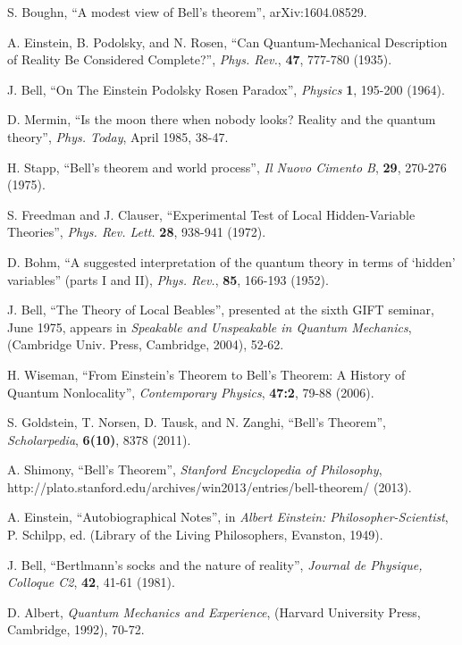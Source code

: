 \documentclass[12pt]{article}
\begin{document}
\begin{thebibliography}{99}

 S. Boughn, ``A modest view of Bell's theorem'', arXiv:1604.08529.

 A. Einstein, B. Podolsky, and N. Rosen, ``Can Quantum-Mechanical Description of Reality Be Considered Complete?'', {\it Phys. Rev.}, \textbf{47}, 777-780 (1935).

 J. Bell, ``On The Einstein Podolsky Rosen Paradox'', {\it Physics} \textbf{1}, 195-200 (1964).

 D. Mermin, ``Is the moon there when nobody looks? Reality and the quantum theory'', {\it Phys. Today}, April 1985, 38-47.

 H. Stapp, ``Bell's theorem and world process'', {\it Il Nuovo Cimento B}, \textbf{29}, 270-276 (1975).

 S. Freedman and J. Clauser, ``Experimental Test of Local Hidden-Variable Theories'', {\it Phys. Rev. Lett.} \textbf{28}, 938-941 (1972).

 D. Bohm, ``A suggested interpretation of the quantum theory in terms of `hidden' variables'' (parts I and II), {\it Phys. Rev.}, \textbf{85}, 166-193 (1952).

 J. Bell, ``The Theory of Local Beables'', presented at the sixth GIFT seminar, June 1975, appears in {\it Speakable and Unspeakable in Quantum Mechanics}, (Cambridge Univ. Press, Cambridge, 2004), 52-62.

 H. Wiseman, ``From Einstein's Theorem to Bell's Theorem: A History of Quantum Nonlocality'', {\it Contemporary Physics}, \textbf{47:2}, 79-88 (2006).

 S. Goldstein, T. Norsen, D. Tausk, and N. Zanghi, ``Bell's Theorem'', {\it Scholarpedia}, \textbf{6(10)}, 8378 (2011).

 A. Shimony, ``Bell's Theorem'', {\it Stanford Encyclopedia of Philosophy}, http://plato.stanford.edu/archives/win2013/entries/bell-theorem/ (2013).

 A. Einstein, ``Autobiographical Notes'', in {\it Albert Einstein: Philosopher-Scientist}, P. Schilpp, ed. (Library of the Living Philosophers, Evanston, 1949).

 J. Bell, ``Bertlmann's socks and the nature of reality'', {\it Journal de Physique, Colloque C2}, \textbf{42}, 41-61 (1981).

 D. Albert, {\it Quantum Mechanics and Experience}, (Harvard University Press, Cambridge, 1992), 70-72.


\end{thebibliography}
\end{document}

